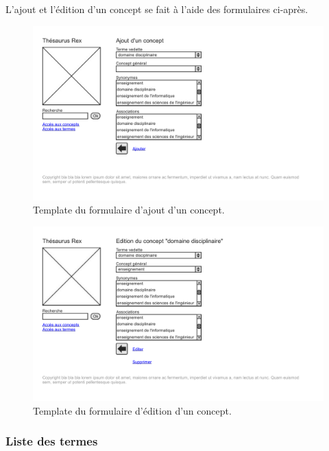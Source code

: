 L'ajout et l'édition d'un concept se fait à l'aide des formulaires ci-après.
\begin{figure}[H]
\begin{center}
\includegraphics[width=\textwidth]{files/template_concept_add}
\end{center}
\caption{Template du formulaire d'ajout d'un concept.}
\end{figure}
\begin{figure}[H]
\begin{center}
\includegraphics[width=\textwidth]{files/template_concept_edit}
\end{center}
\caption{Template du formulaire d’édition d'un concept.}
\end{figure}

\subsubsection{Liste des termes}

